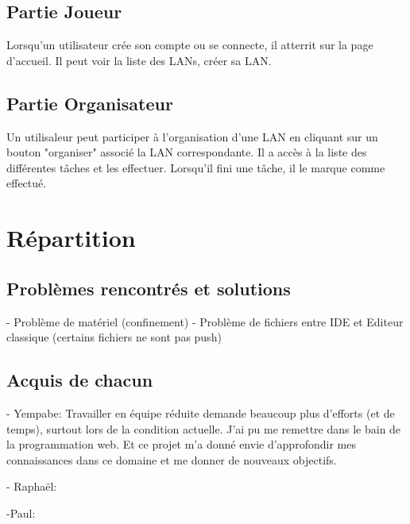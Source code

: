 \documentclass[12pt]{article}
\begin{document}
\subsection{Partie Joueur}
Lorsqu'un utilisateur crée son compte ou se connecte, il atterrit sur la page d'accueil. Il peut voir la liste des LANs, créer sa LAN.
\subsection{Partie Organisateur}
Un utilisaleur peut participer à l'organisation d'une LAN en cliquant sur un bouton "organiser" associé la LAN correspondante. Il a accès à la liste des différentes tâches et les effectuer.
Lorsqu'il fini une tâche, il le marque comme effectué.
\newpage
\section{Répartition}
\subsection{Problèmes rencontrés et solutions}
\newline
- Problème de matériel (confinement)
- Problème de fichiers entre IDE et Editeur classique (certains fichiers ne sont pas push)

\subsection{Acquis de chacun}
\newline
- Yempabe: Travailler en équipe réduite demande beaucoup plus d'efforts (et de temps), surtout lors de la condition actuelle. J'ai pu me remettre dans le bain de la programmation web. Et ce projet m'a donné envie d'approfondir mes connaissances dans ce domaine et me donner de nouveaux objectifs.

- Raphaël:

-Paul:
\end{document}
